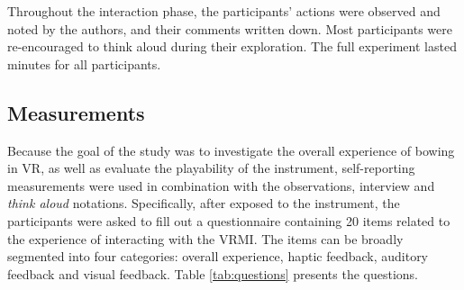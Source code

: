 \documentclass[dvipsnames, pdftex]{article}
\begin{document}
Throughout the interaction phase, the participants' actions were observed and noted by the authors, and their comments written down. Most participants were re-encouraged to think aloud during their exploration. The full experiment lasted  minutes for all participants.
\subsection{Measurements}

Because the  goal of the study was to investigate the overall experience of bowing in VR, as well as evaluate the playability of the instrument,  self-reporting measurements were used in combination with the observations, interview and \textit{think aloud} notations. Specifically, after exposed to the instrument, the participants were asked to fill out a questionnaire containing 20 items related to the experience of interacting with the VRMI. The items can be broadly segmented into four categories: overall experience, haptic feedback, auditory feedback and visual feedback. Table \ref{tab:questions} presents the questions.
\end{document}
